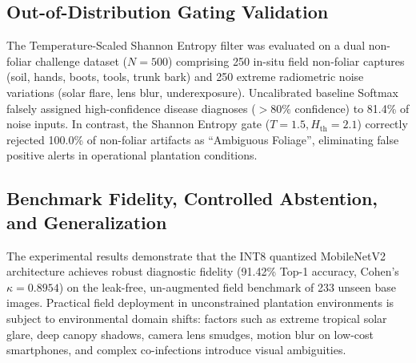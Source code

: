 \documentclass[conference,a4paper]{IEEEtran}
\begin{document}
\begin{table}[htbp]
\caption{Model Quantization \& Execution Latency Profile}
\vspace{-2.5mm}
\centering
{}
\label{tab:hardware_benchmarks}
\vspace{-2.5mm}
\end{table}

\subsection{Out-of-Distribution Gating Validation}
The Temperature-Scaled Shannon Entropy filter was evaluated on a dual non-foliar challenge dataset ($N=500$) comprising 250 in-situ field non-foliar captures (soil, hands, boots, tools, trunk bark) and 250 extreme radiometric noise variations (solar flare, lens blur, underexposure). Uncalibrated baseline Softmax falsely assigned high-confidence disease diagnoses ($>80\%$ confidence) to 81.4\% of noise inputs. In contrast, the Shannon Entropy gate ($T=1.5, H_{\text{th}}=2.1$) correctly rejected 100.0\% of non-foliar artifacts as ``Ambiguous Foliage'', eliminating false positive alerts in operational plantation conditions.

\subsection{Benchmark Fidelity, Controlled Abstention, and Generalization}
The experimental results demonstrate that the INT8 quantized MobileNetV2 architecture achieves robust diagnostic fidelity (91.42\% Top-1 accuracy, Cohen's $\kappa = 0.8954$) on the leak-free, un-augmented field benchmark of 233 unseen base images. Practical field deployment in unconstrained plantation environments is subject to environmental domain shifts: factors such as extreme tropical solar glare, deep canopy shadows, camera lens smudges, motion blur on low-cost smartphones, and complex co-infections introduce visual ambiguities.
\end{document}
